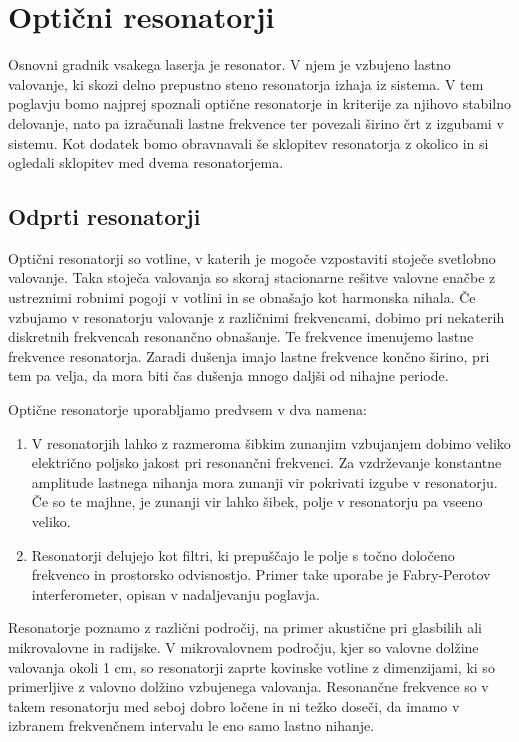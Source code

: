 
\chapter{Optični resonatorji}
Osnovni gradnik vsakega laserja je resonator. V njem je vzbujeno lastno valovanje,
ki skozi delno prepustno steno resonatorja izhaja iz sistema. V tem poglavju bomo 
najprej spoznali optične resonatorje in kriterije za njihovo stabilno delovanje,
nato pa izračunali lastne frekvence ter povezali širino črt z izgubami v sistemu. 
Kot dodatek bomo obravnavali še sklopitev resonatorja z okolico in si ogledali 
sklopitev med dvema resonatorjema.

\section{Odprti resonatorji}
Optični resonatorji so votline, v katerih je mogoče 
vzpostaviti stoječe svetlobno valovanje. Taka stoječa valovanja so skoraj 
stacionarne rešitve valovne enačbe z ustreznimi robnimi pogoji v votlini 
in se obnašajo kot harmonska nihala. Če vzbujamo v resonatorju valovanje z 
različnimi frekvencami, dobimo pri nekaterih diskretnih frekvencah resonančno
obnašanje. Te frekvence imenujemo lastne frekvence
resonatorja. Zaradi dušenja imajo lastne frekvence končno širino, pri tem pa
velja, da mora biti čas dušenja mnogo daljši od nihajne periode. 

Optične resonatorje uporabljamo predvsem v dva namena:\\
\begin{enumerate}
\item V resonatorjih lahko z razmeroma šibkim zunanjim vzbujanjem dobimo veliko
električno poljsko jakost pri resonančni frekvenci. Za vzdrževanje
konstantne amplitude lastnega nihanja mora zunanji vir pokrivati izgube
v resonatorju. Če so te majhne, je zunanji vir lahko šibek, polje
v resonatorju pa vseeno veliko.\\
\item Resonatorji delujejo kot filtri, ki prepuščajo le polje s točno  
določeno frekvenco in prostorsko odvisnostjo. Primer take uporabe je 
Fabry-Perotov interferometer, opisan 
v nadaljevanju poglavja. \\
\end{enumerate}

Resonatorje poznamo z različni področij, na primer akustične pri glasbilih ali 
mikrovalovne in radijske. V mikrovalovnem področju, kjer so valovne dolžine valovanja
okoli 1 cm, so resonatorji zaprte kovinske votline z dimenzijami, ki so primerljive z 
valovno dolžino vzbujenega valovanja. Resonančne frekvence so v takem resonatorju 
med seboj dobro ločene in ni težko doseči, da imamo v izbranem 
frekvenčnem intervalu le eno samo lastno nihanje.

